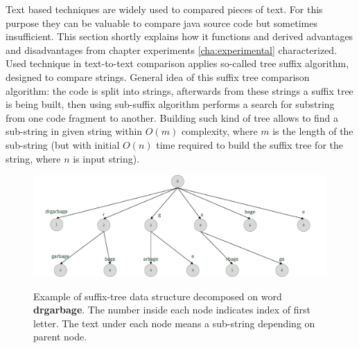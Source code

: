\documentclass{report}
\begin{document}
Text based techniques are widely used to compared pieces of text. For this purpose they can be valuable to compare java source code but sometimes insufficient. This section shortly explains how it functions and derived advantages and disadvantages from chapter experiments \ref{cha:experimental} characterized. Used technique in text-to-text comparison applies so-called tree suffix algorithm, designed to compare strings. General idea of this suffix tree comparison algorithm: the code is split into strings, afterwards from these strings a suffix tree is being built, then using sub-suffix algorithm performs a search for substring from one code fragment to another. Building such kind of tree allows to find a sub-string in given string within $O(m)$ complexity, where $m$ is the length of the sub-string (but with initial $O(n)$ time required to build the suffix tree for the string, where $n$ is input string). 
\vspace{5mm}
\begin{figure}[h]
  \centering
  \includegraphics[scale=0.65]{Figures/exist-alg/suffix-tree.pdf}\\[0.1cm]
  \caption[Example of suffix-tree data structure decomposed on word ]{Example of suffix-tree data structure decomposed on word \textbf{drgarbage}. The number inside each node indicates index of first letter. The text under each node means a sub-string depending on parent node.}
  \label{fig:suffixtreeexample}
\end{figure}
\end{document}
